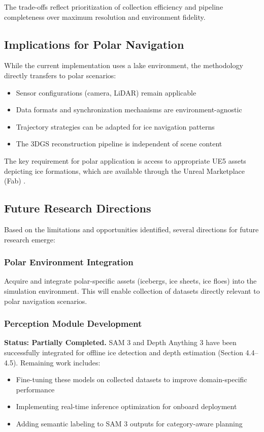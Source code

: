 The trade-offs reflect prioritization of collection efficiency and pipeline completeness over maximum resolution and environment fidelity.

\subsection{Implications for Polar Navigation}

While the current implementation uses a lake environment, the methodology directly transfers to polar scenarios:

\begin{itemize}
    \item Sensor configurations (camera, LiDAR) remain applicable
    \item Data formats and synchronization mechanisms are environment-agnostic
    \item Trajectory strategies can be adapted for ice navigation patterns
    \item The 3DGS reconstruction pipeline is independent of scene content
\end{itemize}

The key requirement for polar application is access to appropriate UE5 assets depicting ice formations, which are available through the Unreal Marketplace (Fab) \parencite{fab2024arctic}.

\subsection{Future Research Directions}

Based on the limitations and opportunities identified, several directions for future research emerge:

\subsubsection{Polar Environment Integration}

Acquire and integrate polar-specific assets (icebergs, ice sheets, ice floes) into the simulation environment. This will enable collection of datasets directly relevant to polar navigation scenarios.

\subsubsection{Perception Module Development}

\textbf{Status: Partially Completed.} SAM 3 and Depth Anything 3 have been successfully integrated for offline ice detection and depth estimation (Section 4.4--4.5). Remaining work includes:
\begin{itemize}
    \item Fine-tuning these models on collected datasets to improve domain-specific performance
    \item Implementing real-time inference optimization for onboard deployment
    \item Adding semantic labeling to SAM 3 outputs for category-aware planning
\end{itemize}


